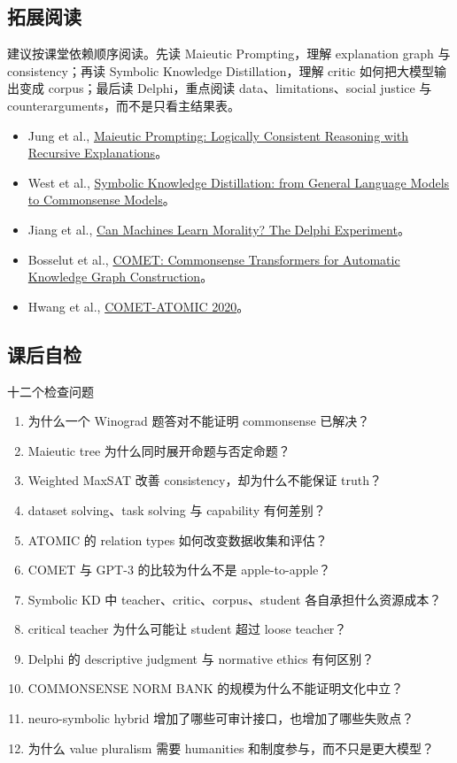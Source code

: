 \documentclass[a4paper]{article}
\begin{document}
\subsection{拓展阅读}

建议按课堂依赖顺序阅读。先读 Maieutic Prompting，理解 explanation graph 与 consistency；再读 Symbolic Knowledge Distillation，理解 critic 如何把大模型输出变成 corpus；最后读 Delphi，重点阅读 data、limitations、social justice 与 counterarguments，而不是只看主结果表。

\begin{itemize}
  \item Jung et al., \href{https://arxiv.org/abs/2205.11822}{Maieutic Prompting: Logically Consistent Reasoning with Recursive Explanations}。
  \item West et al., \href{https://arxiv.org/abs/2110.07178}{Symbolic Knowledge Distillation: from General Language Models to Commonsense Models}。
  \item Jiang et al., \href{https://arxiv.org/abs/2110.07574}{Can Machines Learn Morality? The Delphi Experiment}。
  \item Bosselut et al., \href{https://aclanthology.org/P19-1470/}{COMET: Commonsense Transformers for Automatic Knowledge Graph Construction}。
  \item Hwang et al., \href{https://arxiv.org/abs/2010.05953}{COMET-ATOMIC 2020}。
\end{itemize}

\subsection{课后自检}

\begin{importantbox}{十二个检查问题}
\begin{enumerate}
  \item 为什么一个 Winograd 题答对不能证明 commonsense 已解决？
  \item Maieutic tree 为什么同时展开命题与否定命题？
  \item Weighted MaxSAT 改善 consistency，却为什么不能保证 truth？
  \item dataset solving、task solving 与 capability 有何差别？
  \item ATOMIC 的 relation types 如何改变数据收集和评估？
  \item COMET 与 GPT-3 的比较为什么不是 apple-to-apple？
  \item Symbolic KD 中 teacher、critic、corpus、student 各自承担什么资源成本？
  \item critical teacher 为什么可能让 student 超过 loose teacher？
  \item Delphi 的 descriptive judgment 与 normative ethics 有何区别？
  \item COMMONSENSE NORM BANK 的规模为什么不能证明文化中立？
  \item neuro-symbolic hybrid 增加了哪些可审计接口，也增加了哪些失败点？
  \item 为什么 value pluralism 需要 humanities 和制度参与，而不只是更大模型？
\end{enumerate}
\end{importantbox}
\end{document}
